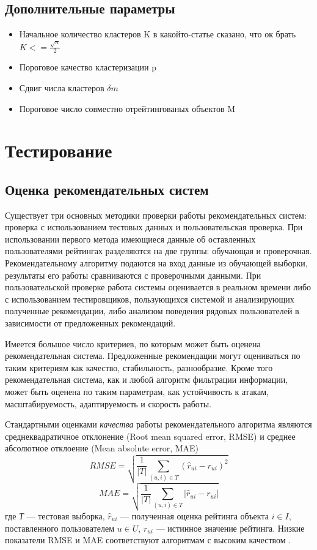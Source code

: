\documentclass[12pt]{article} %
\begin{document}
\subsection{Дополнительные параметры}

\begin{itemize}

\item Начальное количество кластеров K
в какойто-статье сказано, что ок брать $K <= \frac{\sqrt{n}}{2} $
\item Пороговое качество кластеризации p
\item Сдвиг числа кластеров $\delta m$
\item Пороговое число совместно отрейтингованых объектов M

\end{itemize}

\section{Тестирование}


\subsection{Оценка рекомендательных систем}

Существует три основных методики проверки работы рекомендательных систем: проверка с использованием тестовых данных и пользовательская проверка. При использовании первого метода имеющиеся данные об оставленных пользователями рейтингах разделяются на две группы: обучающая и проверочная. Рекомендательному алгоритму подаются на вход данные из обучающей выборки, результаты его работы сравниваются с проверочными данными. При пользовательской проверке работа системы оценивается в реальном времени либо с использованием тестировщиков, пользующихся системой и анализирующих полученные рекомендации, либо анализом поведения рядовых пользователей в зависимости от предложенных рекомендаций.

Имеется большое число критериев, по которым может быть оценена рекомендательная система. Предложенные рекомендации могут оцениваться по таким критериям как качество, стабильность, разнообразие. Кроме того рекомендательная система, как и любой алгоритм фильтрации информации, может быть оценена по таким параметрам, как устойчивость к атакам, масштабируемость, адаптируемость и скорость работы.

Стандартными оценками \textit{качества }работы рекомендательного алгоритма являются среднеквадратичное отклонение (Root mean squared error, RMSE) и среднее абсолютное отклоение (Mean absolute error, MAE)
\[
	RMSE=\sqrt{\frac{1}{|T|}\sum_{(u,i)\in T} (\hat{r}_{ui} - r_{ui})^2}
\]
\[	
	MAE=\sqrt{\frac{1}{|T|}\sum_{(u,i)\in T} |\hat{r}_{ui} - r_{ui}|}
\]
где \textit{Т} --- тестовая выборка,  $\hat{r}_{ui}$ --- полученная оценка рейтинга объекта $i \in I$, поставленного пользователем $u \in U$,  $r_{ui}$ --- истинное значение рейтинга. Низкие показатели RMSE и MAE соответствуют алгоритмам с высоким качеством .
  
\end{document}

